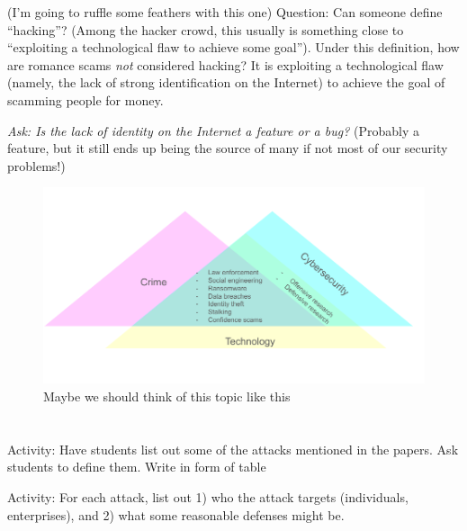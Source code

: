\documentclass[11pt]{article}
\begin{document}
(I'm going to ruffle some feathers with this one) Question: Can someone define ``hacking''? (Among the hacker crowd, this usually is something close to ``exploiting a technological flaw to achieve some goal''). Under this definition, how are romance scams {\it not} considered hacking? It is exploiting a technological flaw (namely, the lack of strong identification on the Internet) to achieve the goal of scamming people for money. 




{\it Ask: Is the lack of identity on the Internet a feature or a bug?} (Probably a feature, but it still ends up being the source of many if not most of our security problems!)


\FloatBarrier

\begin{figure}[H]
    \centering
    \includegraphics*[width=5.5in]{crime_tvd.png}
    \caption{Maybe we should think of this topic like this}
\end{figure}
\FloatBarrier

\section*{}

Activity: Have students list out some of the attacks mentioned in the papers. Ask students to define them. Write in form of table



Activity: For each attack, list out 1) who the attack targets (individuals, enterprises), and 2) what some reasonable defenses might be.
\end{document}
